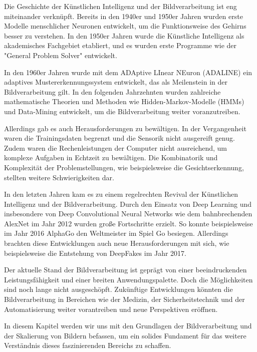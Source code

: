 Die Geschichte der Künstlichen Intelligenz und der Bildverarbeitung ist eng miteinander verknüpft.
Bereits in den 1940er und 1950er Jahren wurden erste Modelle menschlicher Neuronen entwickelt, um die Funktionsweise des Gehirns besser zu verstehen.
In den 1950er Jahren wurde die Künstliche Intelligenz als akademisches Fachgebiet etabliert, und es wurden erste Programme wie der "General Problem Solver" entwickelt.

In den 1960er Jahren wurde mit dem ADAptive LInear NEuron (ADALINE) ein adaptives Mustererkennungssystem entwickelt, das als Meilenstein in der Bildverarbeitung gilt.
In den folgenden Jahrzehnten wurden zahlreiche mathematische Theorien und Methoden wie Hidden-Markov-Modelle (HMMs) und Data-Mining entwickelt, um die Bildverarbeitung weiter voranzutreiben.

Allerdings gab es auch Herausforderungen zu bewältigen. In der Vergangenheit waren die Trainingsdaten begrenzt und die Sensorik nicht ausgereift genug. Zudem waren die Rechenleistungen der Computer nicht ausreichend, um komplexe Aufgaben in Echtzeit zu bewältigen. Die Kombinatorik und Komplexität der Problemstellungen, wie beispielsweise die Gesichtserkennung, stellten weitere Schwierigkeiten dar.

In den letzten Jahren kam es zu einem regelrechten Revival der Künstlichen Intelligenz und der Bildverarbeitung. Durch den Einsatz von Deep Learning und insbesondere von Deep Convolutional Neural Networks wie dem bahnbrechenden AlexNet im Jahr 2012 wurden große Fortschritte erzielt. So konnte beispielsweise im Jahr 2016 AlphaGo den Weltmeister im Spiel Go besiegen. Allerdings brachten diese Entwicklungen auch neue Herausforderungen mit sich, wie beispielsweise die Entstehung von DeepFakes im Jahr 2017.

Der aktuelle Stand der Bildverarbeitung ist geprägt von einer beeindruckenden Leistungsfähigkeit und einer breiten Anwendungspalette. Doch die Möglichkeiten sind noch lange nicht ausgeschöpft. Zukünftige Entwicklungen könnten die Bildverarbeitung in Bereichen wie der Medizin, der Sicherheitstechnik und der Automatisierung weiter vorantreiben und neue Perspektiven eröffnen.

In diesem Kapitel werden wir uns mit den Grundlagen der Bildverarbeitung und der Skalierung von Bildern befassen, um ein solides Fundament für das weitere Verständnis dieses faszinierenden Bereichs zu schaffen.

